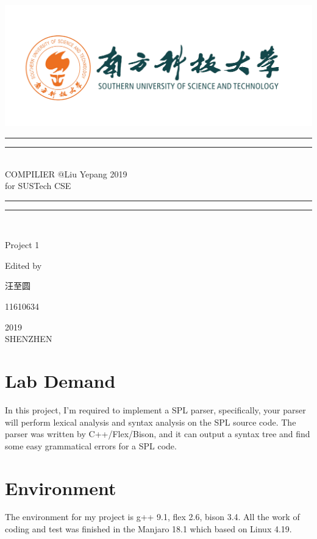 \documentclass{article}
\begin{document}
 
    \begin{titlepage}       %
        \centering
        \includegraphics[width=\textwidth]{../SUSTC_LOGO.png}
        \rule{\textwidth}{1.6pt}\vspace*{-\baselineskip}\vspace*{2pt}
        \rule{\textwidth}{0.4pt}\\[\baselineskip]
        {\LARGE COMPILIER @Liu Yepang 2019\\[\baselineskip]\small for SUSTech CSE}
        \\[0.2\baselineskip]
        \rule{\textwidth}{0.4pt}\vspace*{-\baselineskip}\vspace{3.2pt}
        \rule{\textwidth}{1.6pt}\\[\baselineskip]
        \scshape
        \vspace*{\baselineskip}
        {\Large Project 1\par }
        Edited by \\[\baselineskip] {汪至圆\par}
        {\Large 11610634\par }
        \vfill
        {\scshape 2019} \\{\large SHENZHEN}\par
    \end{titlepage}

    \section{Lab Demand}
        In this project, I'm required to implement a SPL parser, specifically, your parser
        will perform lexical analysis and syntax analysis on the SPL source code. The parser was
        written by C++/Flex/Bison, and it can output a syntax tree and find some easy grammatical 
        errors for a SPL code.

    \section{Environment}
        The environment for my project is g++ 9.1, flex 2.6, bison 3.4. All the work of coding
        and test was finished in the Manjaro 18.1 which based on Linux 4.19.
    
\end{document}
